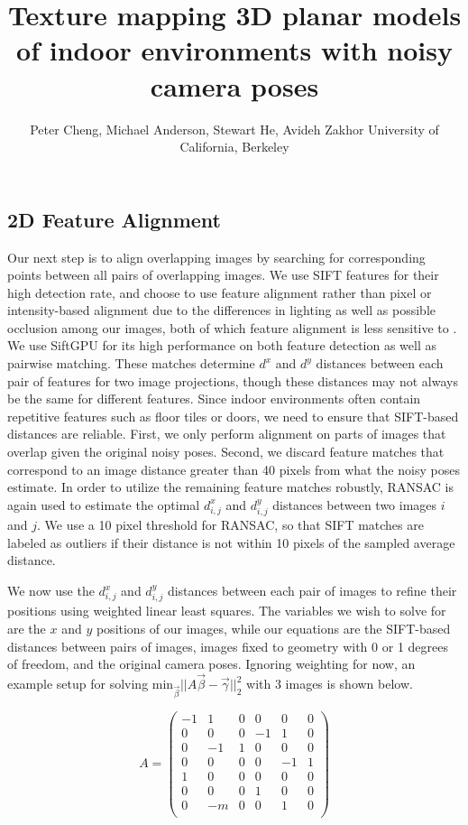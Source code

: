 \documentclass[]{spie}  %
\title{Texture mapping 3D planar models of indoor environments with noisy camera poses}
\author{Peter Cheng, Michael Anderson, Stewart He, Avideh Zakhor
\skiplinehalf
University of California, Berkeley\\
}
\begin{document}
\subsection{2D Feature Alignment}
\label{sec:robustSIFTFeatureMatching}
Our next step is to align overlapping images by searching for
corresponding points between all pairs of overlapping images. We use
SIFT features for their high detection rate, and choose to use feature
alignment rather than pixel or intensity-based alignment due to the
differences in lighting as well as possible occlusion among our
images, both of which feature alignment is less sensitive to
\cite{lowe1999object, mikolajczyk2005performance, szeliski2006image}.
We use SiftGPU \cite{siftgpu} for its high performance on both feature
detection as well as pairwise matching. These matches determine $d^x$
and $d^y$ distances between each pair of features for two image
projections, though these distances may not always be the same for
different features. Since indoor environments often contain repetitive
features such as floor tiles or doors, we need to ensure that
SIFT-based distances are reliable. First, we only perform alignment on
parts of images that overlap given the original noisy poses. Second,
we discard feature matches that correspond to an image distance
greater than 40 pixels from what the noisy poses estimate. In order to
utilize the remaining feature matches robustly, RANSAC
\cite{fischler1981random} is again used to estimate the optimal
$d^x_{i,j}$ and $d^y_{i,j}$ distances between two images $i$ and
$j$. We use a 10 pixel threshold for RANSAC, so that SIFT matches are
labeled as outliers if their distance is not within 10 pixels of the
sampled average distance.


We now use the $d^x_{i,j}$ and $d^y_{i,j}$ distances between each pair
of images to refine their positions using weighted linear least
squares. The variables we wish to solve for are the $x$ and $y$
positions of our images, while our equations are the SIFT-based
distances between pairs of images, images fixed to geometry with 0 or
1 degrees of freedom, and the original camera poses. Ignoring
weighting for now, an example setup for solving
$\textrm{min}_{\vec{\beta}} ||A \vec{\beta} - \vec{\gamma}||_2^2 $
with 3 images is shown below.


\[
A =
\begin{pmatrix}
  -1 & 1 & 0 & 0 & 0 & 0\\
  0 & 0 & 0 & -1 & 1 & 0\\
  0 & -1 & 1 & 0 & 0 & 0\\
  0 & 0 & 0 & 0 & -1 & 1\\
  1 & 0 & 0 & 0 & 0 & 0\\
  0 & 0 & 0 & 1 & 0 & 0\\
  0 & -m & 0 & 0 & 1 & 0\\
\end{pmatrix}
\]
\end{document}

